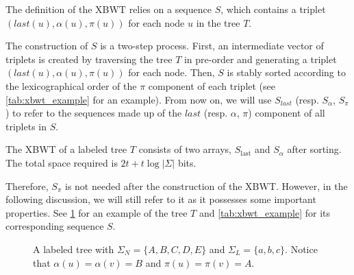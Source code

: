 The definition of the XBWT relies on a sequence $S$, which contains a triplet \\ 
$(last(u), \alpha(u), \pi(u))$ for each node $u$ in the tree $T$.

The construction of $S$ is a two-step process. First, an intermediate vector of triplets is created by traversing the tree $T$ in pre-order and generating a triplet $(last(u), \alpha(u), \pi(u))$ for each node. Then, $S$ is stably sorted according to the lexicographical order of the $\pi$ component of each triplet (see \cref{tab:xbwt_example} for an example).
From now on, we will use $S_{last}$ (resp. $S_{\alpha}$, $S_{\pi}$) to refer to the sequences made up of the $last$ (resp. $\alpha$, $\pi$) component of all triplets in $S$.

\begin{theorem}
    The XBWT of a labeled tree $T$ consists of two arrays, $S_{\text{last}}$ and $S_{\alpha}$ after sorting.
    The total space required is $2t + t \log |\Sigma|$ bits.
\end{theorem}

Therefore, $S_{\pi}$ is not needed after the construction of the XBWT. However, in the following discussion, we will still refer to it as it possesses some important properties. See \cref{fig:example_tree} for an example of the tree $T$ and \cref{tab:xbwt_example} for its corresponding sequence $S$.

\begin{figure}[ht]
    \centering
    
    \caption{A labeled tree with $\Sigma_N = \{A, B, C, D, E\}$ and $\Sigma_L = \{a, b, c\}$. Notice that $\alpha(u) = \alpha(v) = B$ and $\pi(u) = \pi(v) = A$.}
    \label{fig:example_tree}
\end{figure}

